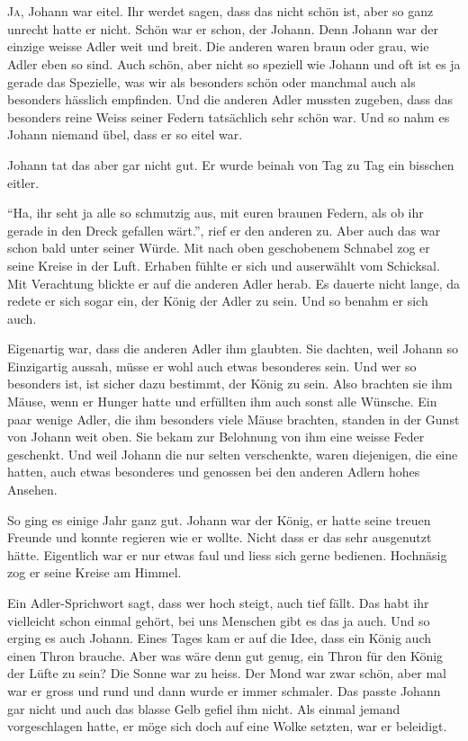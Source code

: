 \chapter*{}
\lettrine[lines=3]{\color{DeepPink}J}{a}, Johann war eitel. Ihr werdet sagen, dass das nicht schön ist, aber so ganz unrecht hatte er nicht. Schön war er schon, der Johann. Denn Johann war der einzige weisse Adler weit und breit. Die anderen waren braun oder grau, wie Adler eben so sind. Auch schön, aber nicht so speziell wie Johann und oft ist es ja gerade das Spezielle, was wir als besonders schön oder manchmal auch als besonders hässlich empfinden. Und die anderen Adler mussten zugeben, dass das besonders reine Weiss seiner Federn tatsächlich sehr schön war. Und so nahm es Johann niemand übel, dass er so eitel war. 

Johann tat das aber gar nicht gut. Er wurde beinah von Tag zu Tag ein bisschen eitler. 

\enquote{Ha, ihr seht ja alle so schmutzig aus, mit euren braunen Federn, als ob ihr gerade in den Dreck gefallen wärt.}, rief er den anderen zu. Aber auch das war schon bald unter seiner Würde. Mit nach oben geschobenem Schnabel zog er seine Kreise in der Luft. Erhaben fühlte er sich und auserwählt vom Schicksal. Mit Verachtung blickte er auf die anderen Adler herab. Es dauerte nicht lange, da redete er sich sogar ein, der König der Adler zu sein. Und so benahm er sich auch.

Eigenartig war, dass die anderen Adler ihm glaubten. Sie dachten, weil Johann so Einzigartig aussah, müsse er wohl auch etwas besonderes sein. Und wer so besonders ist, ist sicher dazu bestimmt, der König zu sein. Also brachten sie ihm Mäuse, wenn er Hunger hatte und erfüllten ihm auch sonst alle Wünsche. Ein paar wenige Adler, die ihm besonders viele Mäuse brachten, standen in der Gunst von Johann weit oben. Sie bekam zur Belohnung von ihm eine weisse Feder geschenkt. Und weil Johann die nur selten verschenkte, waren diejenigen, die eine hatten, auch etwas besonderes und genossen bei den anderen Adlern hohes Ansehen. 

So ging es einige Jahr ganz gut. Johann war der König, er hatte seine treuen Freunde und konnte regieren wie er wollte. Nicht dass er das sehr ausgenutzt hätte. Eigentlich war er nur etwas faul und liess sich gerne bedienen. Hochnäsig zog er seine Kreise am Himmel.

Ein Adler-Sprichwort sagt, dass wer hoch steigt, auch tief fällt. Das habt ihr vielleicht schon einmal gehört, bei uns Menschen gibt es das ja auch. Und so erging es auch Johann. Eines Tages kam er auf die Idee, dass ein König auch einen Thron brauche. Aber was wäre denn gut genug, ein Thron für den König der Lüfte zu sein? Die Sonne war zu heiss. Der Mond war zwar schön, aber mal war er gross und rund und dann wurde er immer schmaler. Das passte Johann gar nicht und auch das blasse Gelb gefiel ihm nicht. Als einmal jemand vorgeschlagen hatte, er möge sich doch auf eine Wolke setzten, war er beleidigt.

